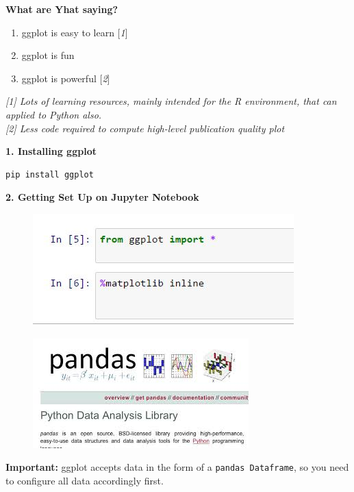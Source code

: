 \documentclass{beamer}
\begin{document}
\begin{frame}
\Large
\noindent\textbf{What are Yhat saying?}

\begin{enumerate}
	\item ggplot is easy to learn [\textit{1}]
	\item ggplot is fun
	\item ggplot is powerful [\textit{2}]
\end{enumerate}

\begin{framed}
\textit{[1] Lots of learning resources, mainly intended for the R environment, that can applied to Python also.}\\
\bigskip
\textit{[2] Less code required to compute high-level publication quality plot}
\end{framed}
\end{frame}
\begin{frame}[fragile]
\textbf{1. Installing ggplot}
\begin{framed}
\begin{verbatim}
pip install ggplot
\end{verbatim}
\end{framed}
\textbf{2. Getting Set Up on Jupyter Notebook}
\begin{figure}
\centering
\includegraphics[width=0.7\linewidth]{jupyter1}
\end{figure}

\end{frame}
\begin{frame}
	\Large
	\begin{figure}
\centering
\includegraphics[width=0.7\linewidth]{pandas}
\end{figure}

	\textbf{Important:} ggplot accepts data in the form of a \texttt{pandas Dataframe}, so you need to configure all data accordingly first.
\end{frame}
\end{document}
